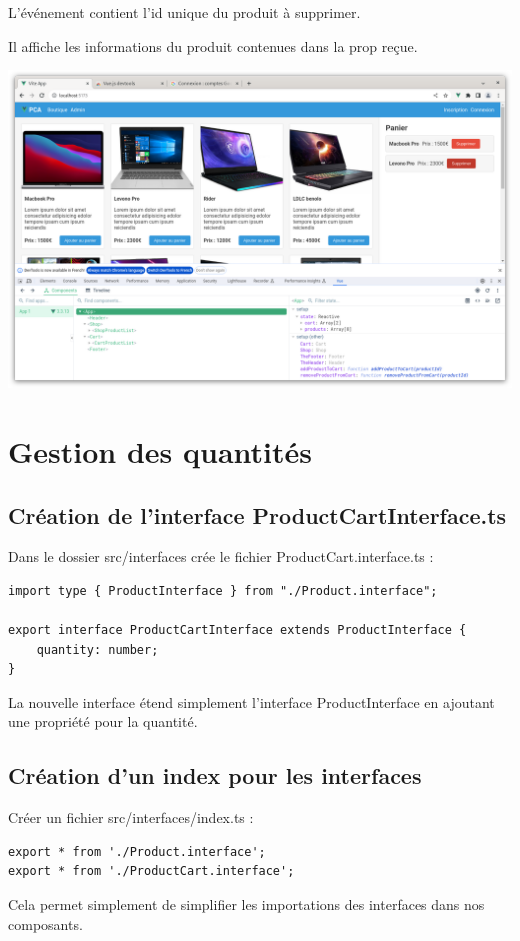 L'événement contient l'{\color{monOrange}id} unique du produit à supprimer.

Il affiche les informations du produit contenues dans la {\color{monOrange}prop} reçue.

\begin{center}
\includegraphics[width=15cm]{images/image22.png}
\end{center}

\section{Gestion des quantités}
\subsection{Création de l'interface {\color{monOrange}ProductCartInterface.ts}}
Dans le dossier {\color{monOrange}src/interfaces} crée le fichier {\color{monOrange}ProductCart.interface.ts} :
\begin{verbatim}
import type { ProductInterface } from "./Product.interface";

export interface ProductCartInterface extends ProductInterface {
    quantity: number;
}
\end{verbatim}
La nouvelle interface étend simplement l'interface {\color{monOrange}ProductInterface} en ajoutant une propriété pour la quantité.

\subsection{Création d'un {\color{monOrange}index} pour les interfaces}
Créer un fichier {\color{monOrange}src/interfaces/index.ts} :
\begin{verbatim}
export * from './Product.interface';
export * from './ProductCart.interface';
\end{verbatim}
Cela permet simplement de simplifier les importations des interfaces dans nos composants.


